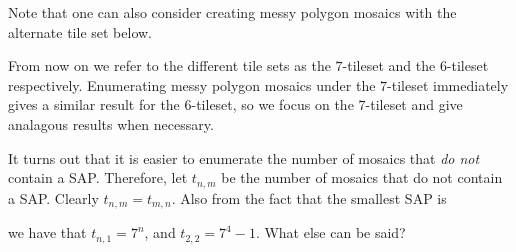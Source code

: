 \documentclass[12pt]{article}
\theoremstyle{plain}
\theoremstyle{definition}
\theoremstyle{remark}
\theoremstyle{definition}
\newcommand{\cellA}[4]{ \draw[thick] ( #1 , #2 ) rectangle ( #3 , #4 ); \draw[red, thick] (#3 * 0.5 + #1 * 0.5 , #2) -- (#3, #4 * 0.5 + #2 * 0.5);}
\newcommand{\cellB}[4]{ \draw[thick] ( #1 , #2 ) rectangle ( #3 , #4 ); \draw[red, thick] (#3 * 0.5 + #1 * 0.5 , #2) -- (#1, #4 * 0.5 + #2 * 0.5);}
\newcommand{\cellC}[4]{ \draw[thick] ( #1 , #2 ) rectangle ( #3 , #4 ); \draw[red, thick] (#3 * 0.5 + #1 * 0.5 , #4) -- (#1, #4 * 0.5 + #2 * 0.5);}
\newcommand{\cellD}[4]{ \draw[thick] ( #1 , #2 ) rectangle ( #3 , #4 ); \draw[red, thick] (#3 * 0.5 + #1 * 0.5 , #4) -- (#3, #4 * 0.5 + #2 * 0.5);}
\newcommand{\cellE}[4]{ \draw[thick] ( #1 , #2 ) rectangle ( #3 , #4 ); \draw[red, thick] (#3 * 0.5 + #1 * 0.5 , #2) -- (#3 * 0.5 + #1 * 0.5 , #4);}
\newcommand{\cellF}[4]{ \draw[thick] ( #1 , #2 ) rectangle ( #3 , #4 ); \draw[red, thick] (#3, #4 * 0.5 + #2 * 0.5) -- (#1, #4 * 0.5 + #2 * 0.5);}
\begin{document}
Note that one can also consider creating messy polygon mosaics with the alternate tile set below.

\begin{center}
\end{center}

From now on we refer to the different tile sets as the $7$-tileset and the $6$-tileset respectively. Enumerating messy polygon mosaics under the $7$-tileset immediately gives a similar result for the $6$-tileset, so we focus on the $7$-tileset and give analagous results when necessary.

It turns out that it is easier to enumerate the number of mosaics that \textit{do not} contain a SAP. Therefore, let $t_{n,m}$ be the number of mosaics that do not contain a SAP. Clearly $t_{n,m}=t_{m,n}.$ Also from the fact that the smallest SAP is

\begin{center}
\end{center}

we have that $t_{n,1}=7^n$, and $t_{2,2} = 7^4 - 1$. What else can be said?
\end{document}

